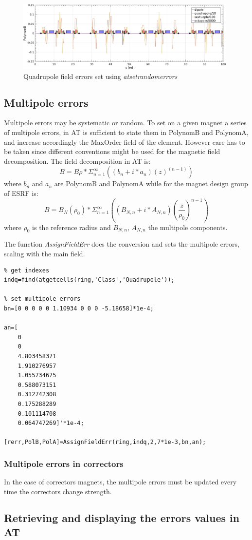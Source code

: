 \begin{figure}[!h]
	\centering
	\includegraphics[width=0.98\textwidth]{./images/FieldIntegral/FieldIntegral.jpg}
	\caption{Quadrupole field errors set using \emph{atsetrandomerrors}}
	\label{fig:girdpitch}
\end{figure}

\clearpage
\subsection{Multipole errors}
Multipole errors may be systematic or random. To set on a given magnet a series of multipole errors, in AT is sufficient to state them in PolynomB and PolynomA, and increase accordingly the MaxOrder field of the element.
However care has to be taken since different conventions might be used for the magnetic field decomposition. The field decomposition in AT is: 
$$
B=B\rho*\Sigma_{n=1}^{\infty}((b_n+i*a_n)(z)^(n-1)) 
$$
where $b_n$ and $a_n$ are PolynomB and PolynomA while for the magnet design group of ESRF is:
$$
B=B_N(\rho_0)*\Sigma_{n=1}^{\infty}((B_{N,n}+i*A_{N,n})(\frac{z}{\rho_0})^{n-1})
$$
where $\rho_0$ is the reference radius and $B_{N,n}$, $A_{N,n}$ the multipole components.

The function \emph{AssignFieldErr} does the conversion and sets the multipole errors, scaling with the main field. 

\begin{lstlisting}
% get indexes
indq=find(atgetcells(ring,'Class','Quadrupole'));

% set multipole errors
bn=[0 0 0 0 0 1.10934 0 0 0 -5.18658]*1e-4;

an=[
    0
    0
    4.803458371
    1.910276957
    1.055734675
    0.588073151
    0.312742308
    0.175288289
    0.101114708
    0.064747269]'*1e-4;

[rerr,PolB,PolA]=AssignFieldErr(ring,indq,2,7*1e-3,bn,an);

\end{lstlisting}

\clearpage
\subsubsection*{Multipole errors in correctors}
In the case of correctors magnets, the multipole errors must be updated every time the correctors change strength. 

\clearpage
\subsection{Retrieving and displaying the errors values in AT}
